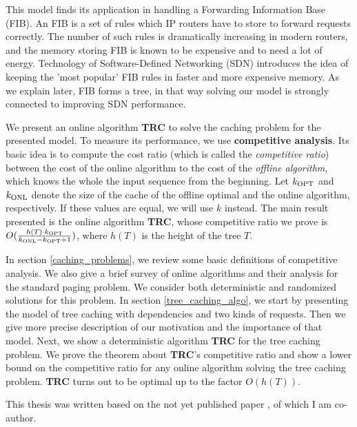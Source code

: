 This model finds its application in handling a Forwarding Information Base (FIB). 
An FIB is a set of rules which IP routers have to store to forward requests
correctly. The number of such rules is dramatically increasing in modern 
routers, and the memory storing FIB is known to be expensive and to need a lot 
of energy. Technology of Software-Defined Networking (SDN) introduces the idea 
of keeping the 'most popular' FIB rules in faster and more expensive memory. 
As we explain later, FIB forms a tree, in that way solving our model is strongly
connected to improving SDN performance.

We present an online algorithm \textbf{TRC} to solve the caching problem 
for the presented model. To measure its performance, we use \textbf{competitive 
analysis}. Its basic idea is to compute the cost ratio (which is called the
\textit{competitive ratio}) between the cost of the online algorithm to the cost of 
the \textit{offline algorithm}, which knows the whole the input sequence from the 
beginning. Let $k_{\mathrm{OPT}}$ and $k_{\mathrm{ONL}}$ denote the size of the cache of the
offline optimal and the online algorithm, respectively. If these values are equal, we
will use $k$ instead. The main result presented is the online algorithm 
\textbf{TRC}, whose competitive ratio we prove is 
$O(\frac{h(T) \cdot k_{\mathrm{OPT}}}{k_{\mathrm{ONL}} - k_{\mathrm{OPT}} + 1})$, where $h(T)$ is
the height of the tree $T$.

In section \ref{caching_problems}, we review some basic definitions of competitive
analysis. We also give a brief survey of online algorithms and their analysis 
for the standard paging problem. We consider both deterministic and randomized 
solutions for this problem. In section \ref{tree_caching_algo}, we start by 
presenting the model of tree caching with dependencies and two kinds of 
requests. Then we give more precise description of our motivation and the importance
of that model. Next, we show a deterministic algorithm \textbf{TRC} for the tree 
caching problem. We prove the theorem about \textbf{TRC}'s  
competitive ratio and show a lower bound on the competitive ratio for any online 
algorithm solving the tree caching problem. \textbf{TRC} turns out to be 
optimal up to the factor $O(h(T))$.

This thesis was written based on the not yet published paper \cite{mypap}, 
of which I am co-author.
